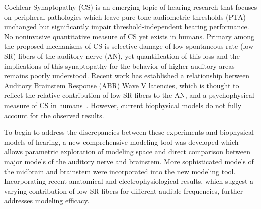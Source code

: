 Cochlear Synaptopathy (CS) is an emerging topic of hearing research that focuses on peripheral pathologies which leave pure-tone audiometric thresholds (PTA) unchanged but significantly impair threshold-independent hearing performance. No noninvasive quantitative measure of CS yet exists in humans. Primary among the proposed mechanisms of CS is selective damage of low spontaneous rate (low SR) fibers of the auditory nerve (AN), yet quantification of this loss and the implications of this synaptopathy for the behavior of higher auditory areas remains poorly understood. Recent work has established a relationship between Auditory Brainstem Response (ABR) Wave V latencies, which is thought to reflect the relative contribution of low-SR fibers to the AN, and a psychophysical measure of CS in humans~\citep{Mehraei2016Auditory}.  However, current biophysical models do not fully account for the observed results.

To begin to address the discrepancies between these experiments and biophysical models of hearing, a new comprehensive modeling tool was developed which allows parametric exploration of modeling space and direct comparison between major models of the auditory nerve and brainstem. More sophisticated models of the midbrain and brainstem were incorporated into the new modeling tool. Incorporating recent anatomical and electrophysiological results, which suggest a varying contribution of low-SR fibers for different audible frequencies, further addresses modeling efficacy.
